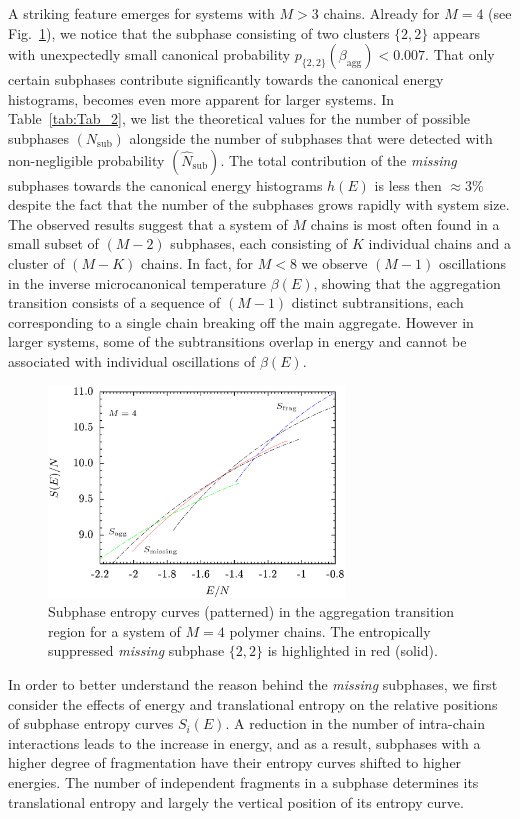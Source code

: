 \documentclass[12pt]{report}
\begin{document}
A striking feature emerges for systems with $M > 3$ chains.
Already for $M = 4$ (see Fig.~\ref{fig:Fig_5}), we notice that the
subphase consisting of 
two clusters $\{2,2\}$ appears with unexpectedly small canonical
probability $p_{\{2,2\}}(\beta_{\mathrm{agg}}) < 0.007$.
That only certain subphases contribute significantly 
towards the canonical energy histograms, becomes even more apparent
for larger systems. In Table~\ref{tab:Tab_2}, we list the theoretical
values for the number of possible subphases $(N_{\mathrm{sub}})$
alongside the number of subphases that were detected 
with non-negligible probability $(\hat{N}_{\mathrm{sub}})$.
The total contribution of the \textit{missing} subphases towards the
canonical
energy histograms $h(E)$ is less then $\approx 3\%$ despite 
the fact that the number of the subphases grows rapidly with system size.
The observed results suggest that a system of $M$ chains 
is most often found in a small subset of $(M-2)$ subphases, 
each consisting of $K$ individual chains and a cluster of $(M - K)$ chains.
In fact, for $M<8$ we observe $(M-1)$ oscillations in the inverse
microcanonical temperature $\beta(E)$, showing that the aggregation
transition consists of a sequence of $(M-1)$ distinct subtransitions,
each corresponding to a single chain breaking off the main aggregate. 
However in larger systems, some of the subtransitions overlap
in energy and cannot be associated with individual oscillations of 
$\beta(E)$.
%
\begin{figure}
\center
\includegraphics[width = 0.7\textwidth]{chapter7Figs/microEntropy.eps}
\caption{\label{fig:Fig_5} Subphase entropy curves (patterned) in the aggregation
transition region for a system of $M=4$ polymer chains. The entropically suppressed 
\textit{missing} subphase $\{2,2\}$ is highlighted in red (solid).}
\end{figure}
%
In order to better understand the reason behind the \textit{missing}
subphases,
we first consider the effects of energy and translational entropy 
on the relative positions of subphase entropy curves $S_{i}(E)$. 
A reduction in the number of intra-chain interactions leads to the increase
in energy, and as a result, subphases with a higher degree of 
fragmentation have their entropy curves shifted to higher energies. 
The number of independent fragments in a subphase determines its
translational entropy and largely the vertical position of its entropy
curve. 
\end{document}
